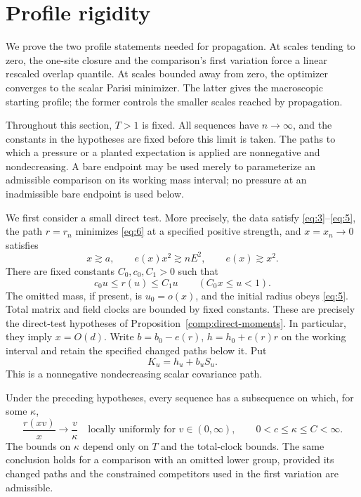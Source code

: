 \section{Profile rigidity}\label{sec:profile}

We prove the two profile statements needed for propagation. At scales
tending to zero, the one-site closure and the comparison's first
variation force a linear rescaled overlap quantile. At scales bounded
away from zero, the optimizer converges to the scalar Parisi minimizer.
The latter gives the macroscopic starting profile; the former controls
the smaller scales reached by propagation.

Throughout this section, $T>1$ is fixed. All sequences have $n\to\infty$,
and the constants in the hypotheses are fixed before this limit is taken.
The paths to which a pressure or a planted expectation is applied are
nonnegative and nondecreasing. A bare endpoint may be used merely to
parameterize an admissible comparison on its working mass interval; no
pressure at an inadmissible bare endpoint is used below.

We first consider a small direct test. More precisely, the data satisfy
\eqref{eq:3}--\eqref{eq:5}, the path $r=r_n$ minimizes \eqref{eq:6} at a
specified positive strength, and $x=x_n\to0$ satisfies
\[
 x\gtrsim a,\qquad e(x)x^2\gtrsim nE^2,\qquad e(x)\gtrsim x^2.
\]
There are fixed constants $C_0,c_0,C_1>0$ such that
\[
 c_0u\le r(u)\le C_1u\qquad (C_0x\le u<1).
\]
The omitted mass, if present, is $u_0=o(x)$, and the initial radius obeys
\eqref{eq:5}. Total matrix and field clocks are bounded by fixed constants.
These are precisely the direct-test hypotheses of
Proposition~\ref{comp:direct-moments}. In particular, they imply $x=O(d)$.
Write $b=b_0-e(r)$, $h=h_0+e(r)r$ on the working interval and retain the
specified changed paths below it. Put
\[
 K_u=h_u+b_uS_u.
\]
This is a nonnegative nondecreasing scalar covariance path.

\begin{theorem}\label{prof:direct-profile}
Under the preceding hypotheses, every sequence has a subsequence on
which, for some $\kappa$,
\begin{equation}
 \frac{r(xv)}{x}\longrightarrow\frac{v}{\kappa}
 \quad\text{locally uniformly for }v\in(0,\infty),
 \qquad 0<c\le\kappa\le C<\infty.
 \tag{28}\label{eq:28}
\end{equation}
The bounds on $\kappa$ depend only on $T$ and the total-clock bounds.
The same conclusion holds for a comparison with an omitted lower group,
provided its changed paths and the constrained competitors used in the
first variation are admissible.
\end{theorem}

